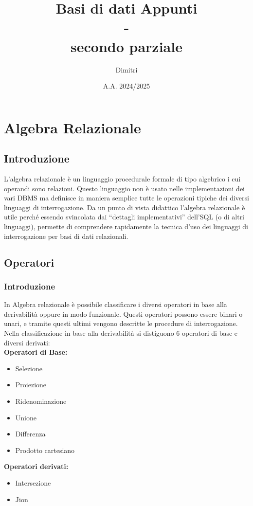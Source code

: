 \documentclass{report}
\title{Basi di dati Appunti\\ -\\ secondo parziale}
\author{Dimitri}
\date{A.A. 2024/2025}
\begin{document}
\maketitle
\newpage
\tableofcontents
\newpage

\chapter{Algebra Relazionale}
\section{Introduzione}
L'algebra relazionale è un linguaggio procedurale formale di tipo algebrico i cui operandi sono relazioni.
Questo linguaggio non è usato nelle implementazioni dei vari DBMS ma definisce in maniera semplice tutte le operazioni tipiche dei diversi linguaggi di interrogazione.
Da un punto di vista didattico l’algebra relazionale è utile perché essendo svincolata dai “dettagli
implementativi” dell’SQL (o di altri linguaggi), permette di comprendere rapidamente la tecnica d’uso dei linguaggi di interrogazione per basi di dati relazionali.\\
\section{Operatori}
\subsection{Introduzione}
In Algebra relazionale è possibile classificare i diversi operatori in base alla derivabilità oppure in modo funzionale. Questi operatori possono essere binari o unari, e tramite questi ultimi vengono descritte le procedure di interrogazione.\\
Nella classificazione in base alla derivabilità si distiguono 6 operatori di base e diversi derivati:\\
\textbf{Operatori di Base:}
\begin{itemize}
    \item Selezione
    \item Proiezione
    \item Ridenominazione
    \item Unione
    \item Differenza
    \item Prodotto cartesiano
\end{itemize}
\textbf{Operatori derivati:}
\begin{itemize}
    \item Intersezione
    \item Jion
\end{itemize}
\newpage
\end{document}
